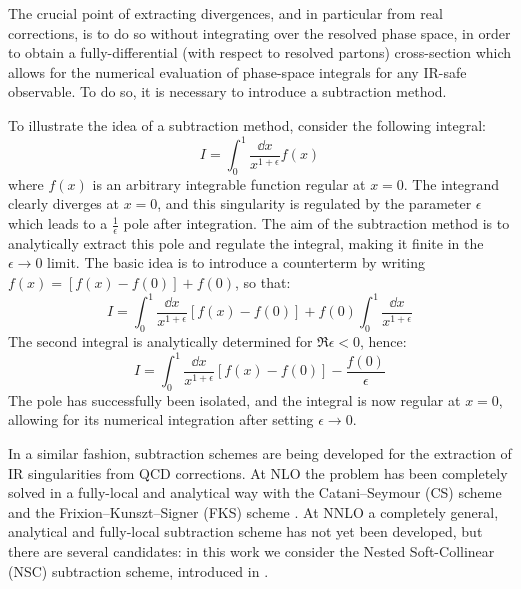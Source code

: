 The crucial point of extracting divergences, and in particular from real corrections, is to do so without integrating over the resolved phase space, in order to obtain a fully-differential (with respect to resolved partons) cross-section which allows for the numerical evaluation of phase-space integrals for any IR-safe observable. To do so, it is necessary to introduce a subtraction method.

To illustrate the idea of a subtraction method, consider the following integral:
\begin{equation}
  I = \int_0^1 \frac{\dd x}{x^{1 + \epsilon}} f(x)
\end{equation}
where $ f(x) $ is an arbitrary integrable function regular at $ x = 0 $. The integrand clearly diverges at $ x = 0 $, and this singularity is regulated by the parameter $ \epsilon $ which leads to a $ \frac{1}{\epsilon} $ pole after integration. The aim of the subtraction method is to analytically extract this pole and regulate the integral, making it finite in the $ \epsilon \rightarrow 0 $ limit. The basic idea is to introduce a counterterm by writing $ f(x) = [f(x) - f(0)] + f(0) $, so that:
\begin{equation*}
  I = \int_0^1 \frac{\dd x}{x^{1 + \epsilon}} \left[ f(x) - f(0) \right] + f(0) \int_0^1 \frac{\dd x}{x^{1 + \epsilon}}
\end{equation*}
The second integral is analytically determined for $ \Re{\epsilon} < 0 $, hence:
\begin{equation}
  I = \int_0^1 \frac{\dd x}{x^{1 + \epsilon}} \left[ f(x) - f(0) \right] - \frac{f(0)}{\epsilon}
\end{equation}
The pole has successfully been isolated, and the integral is now regular at $ x = 0 $, allowing for its numerical integration after setting $ \epsilon \rightarrow 0 $.

In a similar fashion, subtraction schemes are being developed for the extraction of IR singularities from QCD corrections. At NLO the problem has been completely solved in a fully-local and analytical way with the Catani--Seymour (CS) scheme \cite{Catani-1997} and the Frixion--Kunszt--Signer (FKS) scheme \cite{Frixione-1996, Frixione-1997}. At NNLO a completely general, analytical and fully-local subtraction scheme has not yet been developed, but there are several candidates: in this work we consider the Nested Soft-Collinear (NSC) subtraction scheme, introduced in \cite{rontsch-2017}.











